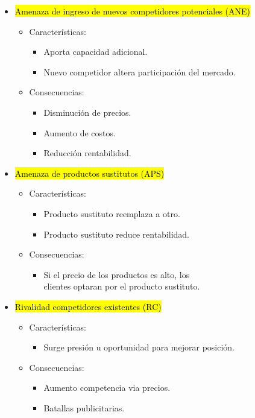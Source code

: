 \documentclass{templateNote}
\begin{document}
\begin{itemize}
    \item \hypertarget{competidoresPotenciales}{\hl{Amenaza de ingreso de nuevos competidores potenciales (ANE)}}
    \begin{itemize}
        \item Características:
        \begin{itemize}
            \item Aporta capacidad adicional.
            \item Nuevo competidor altera participación del mercado.
        \end{itemize}
        \item Consecuencias:
        \begin{itemize}
            \item Disminución de precios.
            \item Aumento de costos.
            \item Reducción rentabilidad.
        \end{itemize}
    \end{itemize}
    \item \hypertarget{sustitutos}{\hl{Amenaza de productos sustitutos (APS)}}
    \begin{itemize}
        \item Características:
        \begin{itemize}
            \item Producto sustituto reemplaza a otro.
            \item Producto sustituto reduce rentabilidad.
        \end{itemize}
        \item Consecuencias:
        \begin{itemize}
            \item Si el precio de los productos es alto, los \\clientes optaran por el producto sustituto.
        \end{itemize}
    \end{itemize}
    \item  \hypertarget{rivalidad}{\hl{Rivalidad competidores existentes (RC)}}
    \begin{itemize}
        \item Características:
        \begin{itemize}
            \item Surge presión u oportunidad para mejorar posición.
        \end{itemize}
        \item Consecuencias:
        \begin{itemize}
            \item Aumento competencia via precios.
            \item Batallas publicitarias.
        \end{itemize}
    \end{itemize}


\end{itemize}
\end{document}
